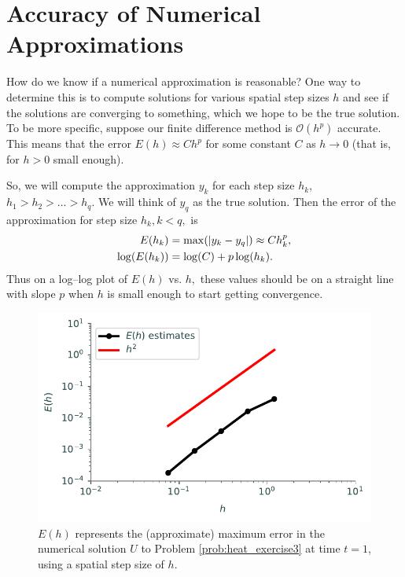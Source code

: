 \section*{Accuracy of Numerical Approximations}

How do we know if a numerical approximation is reasonable?
One way to determine this is to compute solutions for various spatial step sizes $h$ and see if the solutions are converging to something, which we hope to be the true solution.
To be more specific, suppose our finite difference method is $\mathcal{O}(h^p)$ accurate.
This means that the error $E(h) \approx Ch^p$ for some constant $C$ as $h \to 0$ (that is, for $h>0$ small enough).

So, we will compute the approximation $y_k$ for each step size $h_k$, $h_1 > h_2> \ldots>h_q.$
We will think of $y_q$ as the true solution.
Then the error of the approximation for step size $h_k, k < q,$ is
\begin{align*}
	E(h_k) &= \max( \left\lvert y_k - y_q\right\rvert) \approx C h_k^p ,\\
	\log(E(h_k)) &= \log(C) + p \log(h_k).
\end{align*}
Thus on a log--log plot of $E(h)$ vs. $h,$ these values should be on a straight line with slope $p$ when $h$ is small enough to start getting convergence.

\begin{figure}
\centering
\includegraphics[width=\textwidth]{figures/MaximumError.pdf}
\caption{$E(h)$ represents the (approximate) maximum error in the numerical solution $U$ to Problem \ref{prob:heat_exercise3} at time $t=1$, using a spatial step size of $h$.}
\label{fig:heatexercise3}
\end{figure}


